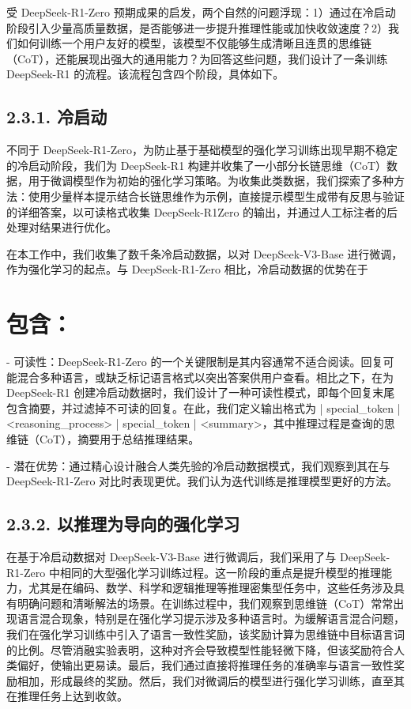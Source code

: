 \documentclass[12pt,a4paper]{report} %
\begin{document}
受 DeepSeek-R1-Zero 预期成果的启发，两个自然的问题浮现：1）通过在冷启动阶段引入少量高质量数据，是否能够进一步提升推理性能或加快收敛速度？2）我们如何训练一个用户友好的模型，该模型不仅能够生成清晰且连贯的思维链（CoT），还能展现出强大的通用能力？为回答这些问题，我们设计了一条训练 DeepSeek-R1 的流程。该流程包含四个阶段，具体如下。


\subsection*{2.3.1. 冷启动}


不同于 DeepSeek-R1-Zero，为防止基于基础模型的强化学习训练出现早期不稳定的冷启动阶段，我们为 DeepSeek-R1 构建并收集了一小部分长链思维（CoT）数据，用于微调模型作为初始的强化学习策略。为收集此类数据，我们探索了多种方法：使用少量样本提示结合长链思维作为示例，直接提示模型生成带有反思与验证的详细答案，以可读格式收集 DeepSeek-R1Zero 的输出，并通过人工标注者的后处理对结果进行优化。


在本工作中，我们收集了数千条冷启动数据，以对 DeepSeek-V3-Base 进行微调，作为强化学习的起点。与 DeepSeek-R1-Zero 相比，冷启动数据的优势在于
\section*{包含：}


- 可读性：DeepSeek-R1-Zero 的一个关键限制是其内容通常不适合阅读。回复可能混合多种语言，或缺乏标记语言格式以突出答案供用户查看。相比之下，在为 DeepSeek-R1 创建冷启动数据时，我们设计了一种可读性模式，即每个回复末尾包含摘要，并过滤掉不可读的回复。在此，我们定义输出格式为 | special\_token | \textless{}reasoning\_process\textgreater{} | special\_token | \textless{}summary\textgreater{}，其中推理过程是查询的思维链（CoT），摘要用于总结推理结果。


- 潜在优势：通过精心设计融合人类先验的冷启动数据模式，我们观察到其在与 DeepSeek-R1-Zero 对比时表现更优。我们认为迭代训练是推理模型更好的方法。


\subsection*{2.3.2. 以推理为导向的强化学习}


在基于冷启动数据对 DeepSeek-V3-Base 进行微调后，我们采用了与 DeepSeek-R1-Zero 中相同的大型强化学习训练过程。这一阶段的重点是提升模型的推理能力，尤其是在编码、数学、科学和逻辑推理等推理密集型任务中，这些任务涉及具有明确问题和清晰解法的场景。在训练过程中，我们观察到思维链（CoT）常常出现语言混合现象，特别是在强化学习提示涉及多种语言时。为缓解语言混合问题，我们在强化学习训练中引入了语言一致性奖励，该奖励计算为思维链中目标语言词的比例。尽管消融实验表明，这种对齐会导致模型性能轻微下降，但该奖励符合人类偏好，使输出更易读。最后，我们通过直接将推理任务的准确率与语言一致性奖励相加，形成最终的奖励。然后，我们对微调后的模型进行强化学习训练，直至其在推理任务上达到收敛。
\end{document}
